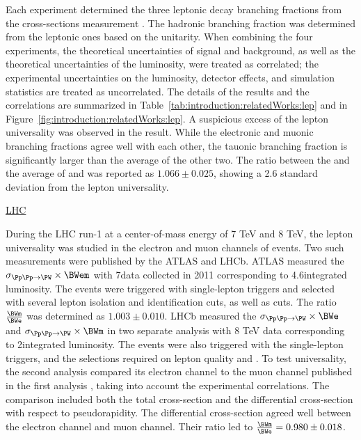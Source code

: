 Each experiment determined the three \PW leptonic decay branching fractions from the \WW cross-sections measurement \cite{Schael:2013ita}. The hadronic branching fraction was determined from the leptonic ones based on the unitarity. When combining the four experiments, the theoretical uncertainties of signal and background, as well as the theoretical uncertainties of the luminosity, were treated as correlated; the experimental uncertainties on the luminosity, detector effects, and simulation statistics are treated as uncorrelated. The details of the \BWl results and the correlations are summarized in Table~\ref{tab:introduction:relatedWorks:lep} and in Figure~\ref{fig:introduction:relatedWorks:lep}. A suspicious excess of the lepton universality was observed in the result. While the electronic and muonic branching fractions agree well with each other, the tauonic branching fraction is significantly larger than the average of the other two. The ratio between the \BWt and the average of \BWe and \BWm was reported as \cite{Schael:2013ita} $1.066 \pm 0.025$, showing a 2.6 standard deviation from the lepton universality.





\FloatBarrier
\underline{LHC}

During the LHC run-1 at a center-of-mass energy of 7 TeV and 8 TeV, the lepton universality was studied in the electron and muon channels of \wjets events. Two such measurements were published by the ATLAS and LHCb. ATLAS measured the $\sigma_{\Pp\Pp \to \PW} \times \BWem$ \cite{Aaboud:2016btc} with 7\TeV data collected in 2011 corresponding to 4.6\fbinv integrated luminosity. The events were triggered with single-lepton triggers and selected with several lepton isolation and identification cuts, as well as \MET cuts. The ratio $\frac{ \BWm }{ \BWe}$ was determined as $1.003\pm 0.010$. LHCb measured the $\sigma_{\Pp\Pp \to \PW} \times \BWe$ \cite{Aaij:2016qqz} and $\sigma_{\Pp\Pp \to \PW} \times \BWm$ \cite{Aaij:2015zlq} in two separate analysis with 8 TeV data corresponding to 2\fbinv integrated luminosity. The events were also triggered with the single-lepton triggers, and the selections required on lepton quality and \MET. To test universality, the second analysis \cite{Aaij:2016qqz} compared its electron channel to the muon channel published in the first analysis \cite{Aaij:2015zlq}, taking into account the experimental correlations. The comparison included both the total cross-section and the differential cross-section with respect to pseudorapidity. The differential cross-section agreed well between the electron channel and muon channel. Their ratio led to $\frac{ \BWm }{ \BWe}  = 0.980 \pm 0.018 $.


